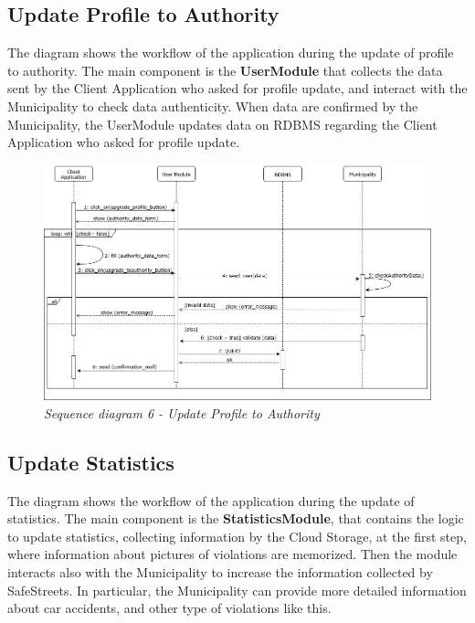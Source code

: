 \subsection{Update Profile to Authority}
The diagram shows the workflow of the application during the update of profile to authority. The main component is the \textbf{UserModule} 
that collects the data sent by the Client Application who asked for profile update, and interact with the Municipality to check data 
authenticity. When data are confirmed by the Municipality, the UserModule updates data on RDBMS regarding the Client Application who asked for 
profile update.

\begin{figure}[H]
  \centering
  \includegraphics[origin=c,width=\textwidth]{DD_Images/RunTimeView/6.jpg}
  \caption{\textit{Sequence diagram 6 - Update Profile to Authority}}
\end{figure}

\subsection{Update Statistics}
The diagram shows the workflow of the application during the update of statistics. The main component is the \textbf{StatisticsModule}, that
contains the logic to update statistics, collecting information by the Cloud Storage, at the first step, where information about pictures of 
violations are memorized. Then the module interacts also with the Municipality to increase the information collected by SafeStreets. In particular, 
the Municipality can provide more detailed information about car accidents, and other type of violations like this.

